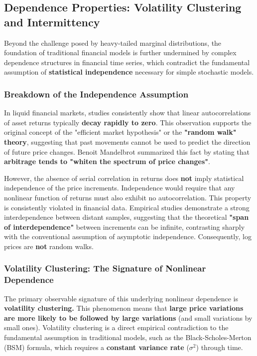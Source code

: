 \documentclass{ieeetj}
\begin{document}
\subsection{Dependence Properties: Volatility Clustering and Intermittency}

Beyond the challenge posed by heavy-tailed marginal distributions, the foundation of traditional financial models is further undermined by complex dependence structures in financial time series, which contradict the fundamental assumption of \textbf{statistical independence} necessary for simple stochastic models.

\subsubsection{Breakdown of the Independence Assumption}

In liquid financial markets, studies consistently show that linear autocorrelations of asset returns typically \textbf{decay rapidly to zero}. This observation supports the original concept of the "efficient market hypothesis" or the \textbf{"random walk" theory}, suggesting that past movements cannot be used to predict the direction of future price changes. Benoit Mandelbrot summarized this fact by stating that \textbf{arbitrage tends to "whiten the spectrum of price changes"}.

However, the absence of serial correlation in returns does \textbf{not} imply statistical independence of the price increments. Independence would require that any nonlinear function of returns must also exhibit no autocorrelation. This property is consistently violated in financial data. Empirical studies demonstrate a strong interdependence between distant samples, suggesting that the theoretical \textbf{"span of interdependence"} between increments can be infinite, contrasting sharply with the conventional assumption of asymptotic independence. Consequently, log prices are \textbf{not} random walks.

\subsubsection{Volatility Clustering: The Signature of Nonlinear Dependence}

The primary observable signature of this underlying nonlinear dependence is \textbf{volatility clustering.} This phenomenon means that \textbf{large price variations are more likely to be followed by large variations} (and small variations by small ones). Volatility clustering is a direct empirical contradiction to the fundamental assumption in traditional models, such as the Black-Scholes-Merton (BSM) formula, which requires a \textbf{constant variance rate} ($\sigma^2$) through time.
 
\end{document}
